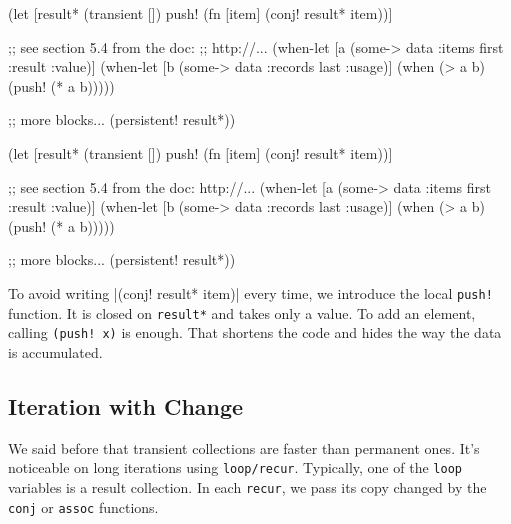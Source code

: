 \ifx\DEVICETYPE\MOBILE

\begin{english}
  \begin{clojure}
(let [result* (transient [])
      push! (fn [item]
              (conj! result* item))]

  ;; see section 5.4 from the doc:
  ;; http://...
  (when-let [a (some-> data
                       :items
                       first
                       :result
                       :value)]
    (when-let [b (some-> data
                       :records
                       last
                       :usage)]
      (when (> a b)
        (push! (* a b)))))

  ;; more blocks...
  (persistent! result*))
  \end{clojure}
\end{english}

\else

\begin{english}
  \begin{clojure}
(let [result* (transient [])
      push! (fn [item]
              (conj! result* item))]

  ;; see section 5.4 from the doc: http://...
  (when-let [a (some-> data :items first :result :value)]
    (when-let [b (some-> data :records last :usage)]
      (when (> a b)
        (push! (* a b)))))

  ;; more blocks...
  (persistent! result*))
  \end{clojure}
\end{english}

\fi


\mnoindent
To avoid writing \spverb|(conj! result* item)| every time, we introduce the local \verb|push!| function.
It is closed on \verb|result*| and takes only a value.
To add an element, calling \verb|(push! x)| is enough. That shortens the code and hides the way the data is accumulated.

\subsection{Iteration with Change}


We said before that transient collections are faster than permanent ones. It's noticeable on long iterations using \verb|loop/recur|.
Typically, one of the \verb|loop| variables is a result collection.
In each \verb|recur|, we pass its copy changed by the \verb|conj| or \verb|assoc| functions.

